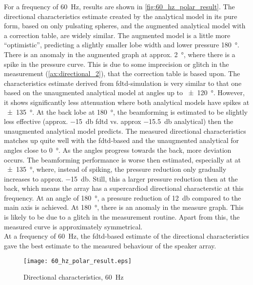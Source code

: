 For a frequency of \SI{60}{\hertz}, results are shown in \autoref{fig:60_hz_polar_result}. The directional characteristics estimate created by the analytical model in its pure form, based on only pulsating spheres, and the augmented analytical model with a correction table, are widely similar. The augmented model is a little more ``optimistic'', predicting a slightly smaller lobe width and lower pressure \SI{180}{\degree}. There is an anomaly in the augmented graph at approx. \SI{2}{\degree}, where there is a spike in the pressure curve. This is due to some imprecision or glitch in the measurement (\autoref{ax:directional_2}), that the correction table is based upon. The characteristics estimate derived from \gls{fdtd}-simulation is very similar to that one based on the unaugmented analytical model at angles up to \SI{\pm 120}{\degree}. However, it shows significantly less attenuation where both analytical models have spikes at \SI{\pm 135}{\degree}. At the back lobe at \SI{180}{\degree}, the beamforming is estimated to be slightly less effective (approx. \SI{-15}{\decibel} \gls{fdtd} vs. approx \SI{-15.5}{\decibel} analytical) then the unaugmented analytical model predicts. The measured directional characteristics matches up quite well with the \gls{fdtd}-based and the unaugmented analytical for angles close to \SI{0}{\degree}. As the angles progress towards the back, more deviation occurs. The beamforming performance is worse then estimated, especially at at \SI{\pm 135}{\degree}, where, instead of spiking, the pressure reduction only gradually increases to approx. \SI{-15}{\decibel}. Still, this a larger pressure reduction then at the back, which means the array has a supercardiod directional characterstic at this frequency. At an angle of \SI{180}{\degree}, a pressure reduction of \SI{12}{\decibel} compared to the main axis is achieved. At \SI{180}{\degree}, there is an anomaly in the measure graph. This is likely to be due to a glitch in the measurement routine. Apart from this, the measured curve is approximately symmetrical.\\
At a frequency of \SI{60}{\hertz}, the \gls{fdtd}-based estimate of the directional characteristics gave the best estimate to the measured behaviour of the speaker array.
\begin{figure}[H]
	\centering
	\texttt{[image: 60\_hz\_polar\_result.eps]}
	\caption{Directional characteristics, \SI{60}{\hertz}}
		\label{fig:60_hz_polar_result}
\end{figure}
